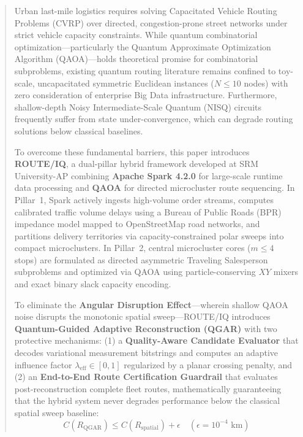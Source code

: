 \documentclass[journal,10pt]{IEEEtran}
\begin{document}
\begin{abstract}
Urban last-mile logistics requires solving Capacitated Vehicle Routing Problems (CVRP) over directed, congestion-prone street networks under strict vehicle capacity constraints. While quantum combinatorial optimization---particularly the Quantum Approximate Optimization Algorithm (QAOA)---holds theoretical promise for combinatorial subproblems, existing quantum routing literature remains confined to toy-scale, uncapacitated symmetric Euclidean instances ($N \le 10$ nodes) with zero consideration of enterprise Big Data infrastructure. Furthermore, shallow-depth Noisy Intermediate-Scale Quantum (NISQ) circuits frequently suffer from state under-convergence, which can degrade routing solutions below classical baselines. 

To overcome these fundamental barriers, this paper introduces \textbf{ROUTE/IQ}, a dual-pillar hybrid framework developed at SRM University-AP combining \textbf{Apache Spark 4.2.0} for large-scale runtime data processing and \textbf{QAOA} for directed microcluster route sequencing. In Pillar~1, Spark actively ingests high-volume order streams, computes calibrated traffic volume delays using a Bureau of Public Roads (BPR) impedance model mapped to OpenStreetMap road networks, and partitions delivery territories via capacity-constrained polar sweeps into compact microclusters. In Pillar~2, central microcluster cores ($m \le 4$ stops) are formulated as directed asymmetric Traveling Salesperson subproblems and optimized via QAOA using particle-conserving $XY$ mixers and exact binary slack capacity encoding. 

To eliminate the \textbf{Angular Disruption Effect}---wherein shallow QAOA noise disrupts the monotonic spatial sweep---ROUTE/IQ introduces \textbf{Quantum-Guided Adaptive Reconstruction (QGAR)} with two protective mechanisms: (1) a \textbf{Quality-Aware Candidate Evaluator} that decodes variational measurement bitstrings and computes an adaptive influence factor $\lambda_{\text{eff}} \in [0, 1]$ regularized by a planar crossing penalty, and (2) an \textbf{End-to-End Route Certification Guardrail} that evaluates post-reconstruction complete fleet routes, mathematically guaranteeing that the hybrid system never degrades performance below the classical spatial sweep baseline:
\[
C(R_{\text{QGAR}}) \le C(R_{\text{spatial}}) + \epsilon \quad (\epsilon = 10^{-4}\text{ km})
\]


\end{abstract}
\end{document}
